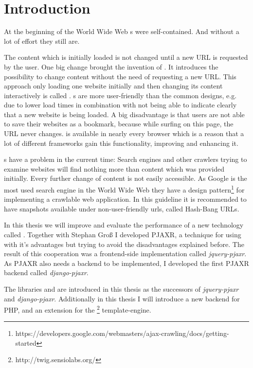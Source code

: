 \section{Introduction}
At the beginning of the World Wide Web \webPage{}s were self-contained. 
And without a lot of effort they still are. 

The content which is initially loaded is not changed until a new URL is requested by the user.
One big change brought the invention of \ajax{}. It introduces the possibility to change content without the need of requesting a new URL.
This approach only loading one website initially and then changing its content interactively is called \singlePageApplication{}.
\SinglePageApplication{}s are more user-friendly than the common designs, e.g. due to lower load times in combination with not being able to indicate clearly that a new website is being loaded.
A big disadvantage is that users are not able to save their websites as a bookmark, because while surfing on this page, the URL never changes.
\ajax{} is available in nearly every browser which is a reason that a lot of different frameworks gain this functionality, improving and enhancing it.

\SinglePageApplication{}s have a problem in the current time: Search engines and other crawlers trying to examine websites will find nothing more than content which was provided initially. Every further change of content is not easily accessible.
As Google is the most used search engine in the World Wide Web they have a design pattern\footnote{https://developers.google.com/webmasters/ajax-crawling/docs/getting-started} for implementing a crawlable \ajax{} web application. 
In this guideline it is recommended to have snapshots available under non-user-friendly \gls{url}s, called Hash-Bang URLs.

In this thesis we will improve and evaluate the performance of a new technology called \lare{}. 
Together with Stephan Gro{\ss} I developed PJAXR, a technique for using \ajax{} with it's advantages but trying to avoid the disadvantages explained before.
The result of this cooperation was a frontend-side implementation called \emph{jquery-pjaxr}.
As PJAXR also needs a backend to be implemented, I developed the first PJAXR backend called \emph{django-pjaxr}.

The libraries \lareJS{} and \djangoLare{} are introduced in this thesis as the successors of \emph{jquery-pjaxr} and \emph{django-pjaxr}.
Additionally in this thesis I will introduce a new \lare{} backend for PHP, \emph{\phpLare{}} and \emph{\twigLare{}} an extension for the \twig{}\footnote{http://twig.sensiolabs.org/} template-engine.
